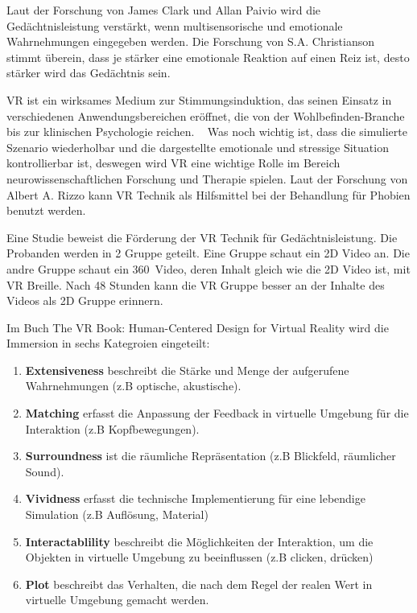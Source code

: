 Laut der Forschung von James Clark und Allan Paivio\citep{10} wird die Gedächtnisleistung verstärkt, wenn multisensorische und emotionale Wahrnehmungen eingegeben werden. Die Forschung von S.A. Christianson\citep{11} stimmt überein, dass je stärker eine emotionale Reaktion auf einen Reiz ist, desto stärker wird das Gedächtnis sein. 

\glqq VR ist ein wirksames Medium zur Stimmungsinduktion, das seinen Einsatz in verschiedenen Anwendungsbereichen eröffnet, die von der Wohlbefinden-Branche bis zur klinischen Psychologie reichen. \grqq\ \citep{29} Was noch wichtig ist, dass die simulierte Szenario wiederholbar und die dargestellte emotionale und stressige Situation kontrollierbar ist, deswegen wird VR eine wichtige Rolle im Bereich neurowissenschaftlichen Forschung und Therapie spielen.\citep{13} Laut der Forschung von Albert A. Rizzo kann VR Technik als Hilfsmittel bei der Behandlung für Phobien benutzt werden.\citep{12}

Eine Studie\citep{30} beweist die Förderung der VR Technik für Gedächtnisleistung. Die Probanden werden in 2 Gruppe geteilt. Eine Gruppe schaut ein 2D Video an. Die andre Gruppe schaut ein 360\degree\ Video, deren Inhalt gleich wie die 2D Video ist, mit VR Breille. Nach 48 Stunden kann die VR Gruppe besser an der Inhalte des Videos als 2D Gruppe erinnern.

Im Buch \glqq The VR Book: Human-Centered Design for Virtual Reality \grqq wird die Immersion in sechs Kategroien eingeteilt: \citep{28}

\begin{enumerate}
\item \textbf{Extensiveness} beschreibt die Stärke und Menge der aufgerufene Wahrnehmungen (z.B optische, akustische).
\item \textbf{Matching} erfasst die Anpassung der Feedback in virtuelle Umgebung für die Interaktion (z.B Kopfbewegungen).
\item \textbf{Surroundness} ist die räumliche Repräsentation (z.B Blickfeld, räumlicher Sound).
\item \textbf{Vividness} erfasst die technische Implementierung für eine lebendige Simulation (z.B Auflösung, Material)
\item \textbf{Interactablility} beschreibt die Möglichkeiten der Interaktion, um die Objekten in virtuelle Umgebung zu beeinflussen (z.B clicken, drücken)
\item \textbf{Plot} beschreibt das Verhalten, die nach dem Regel der realen Wert in virtuelle Umgebung gemacht werden.
\end{enumerate}\

